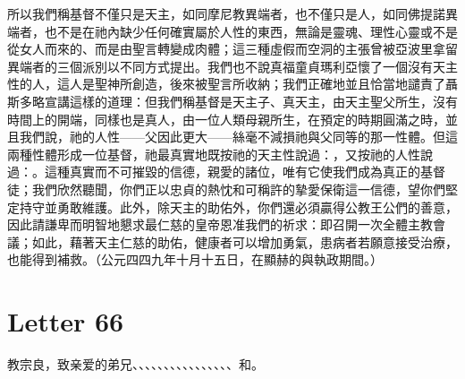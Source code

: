 所以我們稱基督不僅只是天主，如同摩尼教異端者，也不僅只是人，如同佛提諾異端者，也不是在祂內缺少任何確實屬於人性的東西，無論是靈魂、理性心靈或不是從女人而來的、而是由聖言轉變成肉體；這三種虛假而空洞的主張曾被亞波里拿留異端者的三個派別以不同方式提出。我們也不說真福童貞瑪利亞懷了一個沒有天主性的人，這人是聖神所創造，後來被聖言所收納；我們正確地並且恰當地譴責了聶斯多略宣講這樣的道理：但我們稱基督是天主子、真天主，由天主聖父所生，沒有時間上的開端，同樣也是真人，由一位人類母親所生，在預定的時期圓滿之時，並且我們說，祂的人性——父因此更大——絲毫不減損祂與父同等的那一性體。但這兩種性體形成一位基督，祂最真實地既按祂的天主性說過：，又按祂的人性說過：。這種真實而不可摧毀的信德，親愛的諸位，唯有它使我們成為真正的基督徒；我們欣然聽聞，你們正以忠貞的熱忱和可稱許的摯愛保衛這一信德，望你們堅定持守並勇敢維護。此外，除天主的助佑外，你們還必須贏得公教王公們的善意，因此請謙卑而明智地懇求最仁慈的皇帝恩准我們的祈求：即召開一次全體主教會議；如此，藉著天主仁慈的助佑，健康者可以增加勇氣，患病者若願意接受治療，也能得到補救。（公元四四九年十月十五日，在顯赫的與執政期間。）\par



\section{Letter 66}

\par

教宗良，致亲爱的弟兄、、、、、、、、、、、、、、、、和。\par



